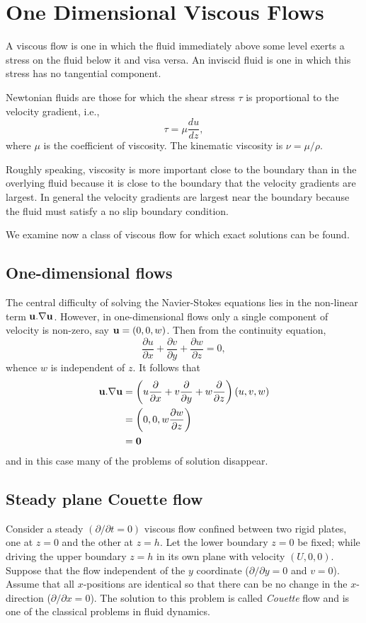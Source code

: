 \documentclass[twoside,a4paper,11pt]{report}
\begin{document}
\cleardoublepage

\chapter{One Dimensional Viscous Flows}
A viscous flow is one in which the fluid immediately above some level exerts 
a stress on the fluid below it and visa versa. An inviscid fluid 
is one in which this stress has no tangential component.

Newtonian fluids are those for which the shear stress $\tau $ is 
proportional to the velocity gradient, i.e.,
\[
\tau =\mu \frac{du}{dz},
\]
where $\mu $ is the coefficient of viscosity. The kinematic viscosity is 
$\nu =\mu /\rho $.

Roughly speaking, viscosity is more important close to the boundary than in 
the overlying fluid because it is close to the boundary that the velocity 
gradients are largest. In general the velocity gradients are largest near 
the boundary because the fluid must satisfy a no slip boundary condition. 

We examine now a class of viscous flow for which exact solutions can be 
found.

\section{One-dimensional flows}
The central difficulty of solving the Navier-Stokes equations lies in the 
non-linear term ${{\bf u}}. \nabla {{\bf u}}$. However, in 
one-dimensional flows only a single component of velocity is non-zero, say 
${{\bf u}}=\left( {0,0,w} \right)$. Then from the continuity equation, 
\[
\frac{\partial u}{\partial x}+\frac{\partial v}{\partial 
y}+\frac{\partial w}{\partial z}=0,
\]
whence $w$ is independent of $z$. It follows that
\begin{align*}
 {{\bf u}}. \nabla {{\bf u}}& =\left( 
{u\frac{\partial }{\partial x}+v\frac{\partial }{\partial 
y}+w\frac{\partial }{\partial z}} \right)(u,v,w) \\ 
&  =\left( {0,0,w\frac{\partial w}{\partial 
z}} \right) \\ 
& ={{\bf 0}} \\ 
 \end{align*}
and in this case many of the problems of solution disappear.

\section{Steady plane Couette flow}
Consider a steady $(\partial /\partial t = 0)$ viscous flow confined 
between two rigid plates, one at $z = 0$ and the other at $z = h$. Let the lower 
boundary $z = 0$ be fixed; while driving the upper boundary $z = h$ in its own 
plane with velocity $(U,0,0)$. Suppose that the flow independent of the $y$ 
coordinate ($\partial /\partial y = 0$ and $v = 0$). Assume that all 
$x$-positions are identical so that there can be no change in the $x$-direction 
($\partial /\partial x = 0$). The solution to this problem is called 
\textit{Couette} flow and is one of the classical problems in fluid dynamics.
\end{document}
